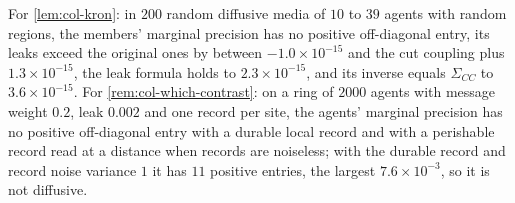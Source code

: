 \begin{numcheck}\label{chk:col-kron}
For \cref{lem:col-kron}: in $200$ random diffusive media of $10$ to $39$ agents with random regions, the members' marginal precision has no positive off-diagonal entry, its leaks exceed the original ones by between $-1.0\times10^{-15}$ and the cut coupling plus $1.3\times10^{-15}$, the leak formula holds to $2.3\times10^{-15}$, and its inverse equals $\Sigma_{CC}$ to $3.6\times10^{-15}$. For \cref{rem:col-which-contrast}: on a ring of $2000$ agents with message weight $0.2$, leak $0.002$ and one record per site, the agents' marginal precision has no positive off-diagonal entry with a durable local record and with a perishable record read at a distance when records are noiseless; with the durable record and record noise variance $1$ it has $11$ positive entries, the largest $7.6\times10^{-3}$, so it is not diffusive.
\end{numcheck}

